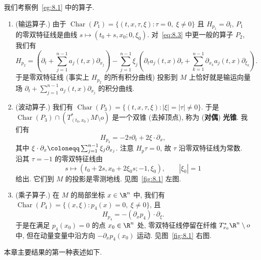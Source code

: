 \begin{example}[零双特征线]\label{eg:8.3}
我们考察例~\ref{eg:8.1} 中的算子.
\begin{enumerate}
    \item (输运算子.) 由于 $\operatorname{Char}(P_1) = \{(t, x, \tau, \xi) \colon \tau = 0, \; \xi \neq 0\}$ 且 $H_{p_1} = \partial_t$, $P_1$ 的零双特征线是曲线 $s \mapsto (t_0 + s, x_0; 0, \xi_0)$. 对~\eqref{eq:8.3} 中更一般的算子 $P_2$, 我们有
    \begin{equation}\label{eq:8.6}
        H_{p_2} = \left( \partial_t + \sum_{j=1}^{n-1} a_j(t, x)\partial_{x_j} \right) - \sum_{j=1}^{n-1} \xi_j \left( \partial_t a_j(t, x)\partial_\tau + \sum_{k=1}^{n-1} \partial_{x_k} a_j(t, x)\partial_{\xi_k} \right).
    \end{equation}
    于是零双特征线 (事实上 $H_{p_2}$ 的所有积分曲线) 投影到 $M$ 上恰好就是输运向量场 $\partial_t + \sum_{j=1}^{n-1} a_j(t, x)\partial_{x_j}$ 的积分曲线.
    \item (波动算子.) 我们有 $\operatorname{Char}(P_3) = \{(t, x, \tau, \xi) \colon | \xi | = | \tau | \neq 0\}$. 于是 $\operatorname{Char}(P_3) \cap (T^*_{(t_0, x_0)}M \setminus o)$ 是一个双锥 (去掉顶点), 称为 (\textbf{对偶}) \textbf{光锥}. 我们有
    \begin{equation}\label{eq:8.7}
        H_{p_3} = -2\tau \partial_t + 2\xi \cdot \partial_x,
    \end{equation}
    其中 $\xi \cdot \partial_x \defeq \sum_{j=1}^{n-1} \xi_j \partial_{x_j}$. 注意 $H_p \tau = 0$, 故 $\tau$ 沿零双特征线为常数. 沿其 $\tau = -1$ 的零双特征线由
    \begin{equation}\label{eq:8.8}
        s \mapsto (t_0 + 2s, x_0 + 2\xi_0 s; -1, \xi_0), \qquad | \xi_0 | = 1
    \end{equation}
    给出. 它们到 $M$ 的投影是零测地线. 见图~\ref{fig:8.1} 左图.
    \item (乘子算子.) 在 $M$ 的局部坐标 $x \in \R^n$ 中, 我们有 $\operatorname{Char}(P_4) = \{(x, \xi) \colon p_4(x) = 0, \; \xi \neq 0\}$, 且
    \begin{equation}\label{eq:8.9}
        H_{p_4} = -(\partial_x p_4) \cdot \partial_\xi.
    \end{equation}
    于是在满足 $p_4(x_0) = 0$ 的点 $x_0 \in \R^n$ 处, 零双特征线停留在纤维 $T^*_{x_0}\R^n \setminus o$ 中, 但在动量变量中沿方向 $-\partial_x p_4(x_0)$ 运动. 见图~\ref{fig:8.1} 右图.
\end{enumerate}
\end{example}

本章主要结果的第一种表述如下.


